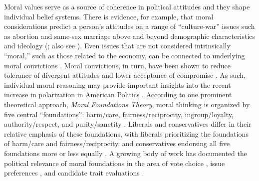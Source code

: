 \documentclass[12pt]{article}
\begin{document}
Moral values serve as a source of coherence in political attitudes and they shape individual belief systems. There is evidence, for example, that moral considerations predict a person's attitudes on a range of ``culture-war'' issues such as abortion and same-sex marriage above and beyond demographic characteristics and ideology (\citealt{koleva2012tracing}; also see \citealt{clifford2015concerns}). Even issues that are not considered intrinsically ``moral,'' such as those related to the economy, can be connected to underlying moral convictions \citep{ryan2014reconsidering}. Moral convictions, in turn, have been shown to reduce tolerance of divergent attitudes and lower acceptance of compromise \citep[][]{skitka2010psychology,ryan2016no}. As such, individual moral reasoning may provide important insights into the recent increase in polarization in American Politics \citep{iyengar2015fear}. According to one prominent theoretical approach, \textit{Moral Foundations Theory}, moral thinking is organized by five central ``foundations'': harm/care, fairness/reciprocity, ingroup/loyalty, authority/respect, and purity/sanctity \citep{haidt2008moral}. Liberals and conservatives differ in their relative emphasis of these foundations, with liberals prioritizing the foundations of harm/care and fairness/reciprocity, and conservatives endorsing all five foundations more or less equally \citep{graham2009liberals}. A growing body of work has documented the political relevance of moral foundations in the area of vote choice \citep{iyer2010beyond, franks2015using}, issue preferences \citep{koleva2012tracing, low2015moral, clifford2015concerns}, and candidate trait evaluations \citep{clifford2014linking}.
\end{document}
